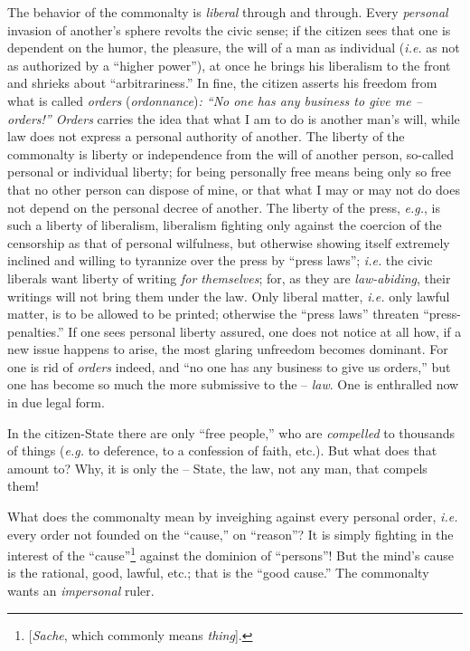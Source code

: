 The behavior of the commonalty is \textit{liberal} through and through. Every 
\textit{personal} invasion of another's sphere revolts the civic sense; if the 
citizen sees that one is dependent on the humor, the pleasure, the will of a 
man as individual (\textit{i.e.} as not as authorized by a ``higher 
power''), at once he brings his liberalism to the front and shrieks about 
``arbitrariness.'' In fine, the citizen asserts his freedom from what is 
called \textit{orders} (\textit{ordonnance})\textit{: ``No one has any 
business to give me -- orders!'' Orders} carries the idea that what I am to 
do is another man's will, while law does not express a personal authority of 
another. The liberty of the commonalty is liberty or independence from the 
will of another person, so-called personal or individual liberty; for being 
personally free means being only so free that no other person can dispose of 
mine, or that what I may or may not do does not depend on the personal decree 
of another. The liberty of the press, \textit{e.g.}, is such a liberty of 
liberalism, liberalism fighting only against the coercion of the censorship as 
that of personal wilfulness, but otherwise showing itself extremely inclined 
and willing to tyrannize over the press by ``press laws''; \textit{i.e.} the 
civic liberals want liberty of writing \textit{for themselves}; for, as they 
are \textit{law-abiding}, their writings will not bring them under the law. 
Only liberal matter, \textit{i.e.} only lawful matter, is to be allowed to be 
printed; otherwise the ``press laws'' threaten ``press-penalties.'' If one 
sees personal liberty assured, one does not notice at all how, if a new issue 
happens to arise, the most glaring unfreedom becomes dominant. For one is rid 
of \textit{orders} indeed, and ``no one has any business to give us 
orders,'' but one has become so much the more submissive to the -- 
\textit{law}. One is enthralled now in due legal form.

In the citizen-State there are only ``free people,'' who are 
\textit{compelled} to thousands of things (\textit{e.g.} to deference, to a 
confession of faith, etc.). But what does that amount to? Why, it is only the 
-- State, the law, not any man, that compels them!

What does the commonalty mean by inveighing against every personal order, 
\textit{i.e.} every order not founded on the ``cause,'' on ``reason''? It 
is simply fighting in the interest of the 
``cause''\footnote{[\textit{Sache}, which commonly means \textit{thing}].} 
against the dominion of ``persons''! But the mind's cause is the rational, 
good, lawful, etc.; that is the ``good cause.'' The commonalty wants an 
\textit{impersonal} ruler.

